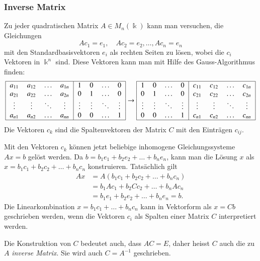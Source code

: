 \subsubsection{Inverse Matrix}
Zu jeder quadratischen Matrix $A\in M_n(\Bbbk)$ kann man versuchen, die
Gleichungen
\[
Ac_1 = e_1,\quad Ac_2 = e_2, \dots, Ac_n = e_n
\]
mit den Standardbasisvektoren $e_i$ als rechten Seiten zu lösen, wobei
die $c_i$ Vektoren in $\Bbbk^n$ sind.
Diese Vektoren kann man mit Hilfe des Gauss-Algorithmus finden:
\[
\begin{tabular}{|>{$}c<{$}>{$}c<{$}>{$}c<{$}>{$}c<{$}|>{$}c<{$}>{$}c<{$}>{$}c<{$}>{$}c<{$}|}
\hline
a_{11}&a_{12}&\dots &a_{1n}&1     &0     &\dots &0     \\
a_{21}&a_{22}&\dots &a_{2n}&0     &1     &\dots &0     \\
\vdots&\vdots&\ddots&\vdots&\vdots&\vdots&\ddots&\vdots\\
a_{n1}&a_{n2}&\dots &a_{nn}&0     &0     &\dots &1     \\
\hline
\end{tabular}
\rightarrow
\begin{tabular}{|>{$}c<{$}>{$}c<{$}>{$}c<{$}>{$}c<{$}|>{$}c<{$}>{$}c<{$}>{$}c<{$}>{$}c<{$}|}
\hline
1     &0     &\dots &0     &c_{11}&c_{12}&\dots &c_{1n}\\
0     &1     &\dots &0     &c_{21}&c_{22}&\dots &c_{2n}\\
\vdots&\vdots&\ddots&\vdots&\vdots&\vdots&\ddots&\vdots\\
0     &0     &\dots &1     &c_{n1}&c_{n2}&\dots &c_{nn}\\
\hline
\end{tabular}
\]
Die Vektoren $c_k$ sind die Spaltenvektoren der Matrix $C$ mit den
Einträgen $c_{i\!j}$.

Mit den Vektoren $c_k$ können jetzt beliebige inhomogene Gleichungssysteme
$Ax=b$ gelöst werden.
Da $b = b_1e_1 + b_2e_2 + \dots + b_ne_n$, kann man die Lösung $x$ als
$x = b_1c_1+b_2c_2+\dots+b_nc_n$ konstruieren.
Tatsächlich gilt
\begin{align*}
Ax
&=
A( b_1c_1+b_2c_2+\dots+b_nc_n)
\\
&=
b_1Ac_1 + b_2Cc_2 + \dots + b_nAc_n
\\
&=
b_1e_1 + b_2e_2 + \dots + b_ne_n
=
b.
\end{align*}
Die Linearkombination $x=b_1c_1+\dots+b_nc_n$ kann in Vektorform als $x=Cb$
geschrieben werden, wenn die Vektoren $c_i$ als Spalten einer Matrix $C$ 
interpretiert werden.

Die Konstruktion von $C$ bedeutet auch, dass $AC=E$, daher heisst $C$ auch
die zu $A$ {\em inverse Matrix}.
Sie wird auch $C=A^{-1}$ geschrieben.


